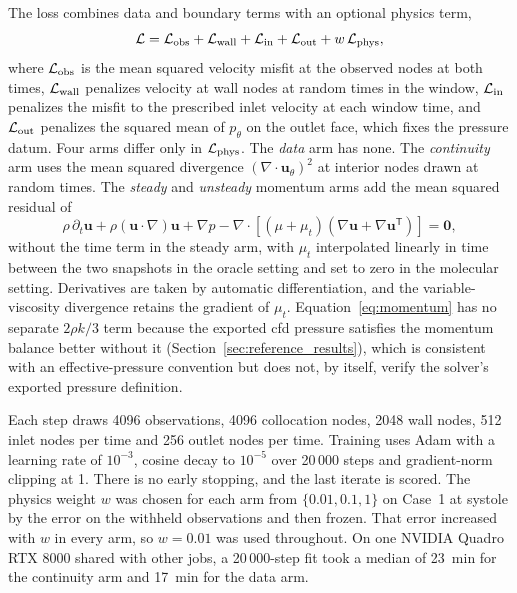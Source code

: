 \documentclass[12pt,a4paper]{article}
\newcommand{\CFD}{\ac{cfd}\xspace}
\theoremstyle{definition}
\numberwithin{equation}{section}
\begin{document}
The loss combines data and boundary terms with an optional physics term,
\begin{equation}
\mathcal L=\mathcal L_{\rm obs}+\mathcal L_{\rm wall}+\mathcal L_{\rm in}+\mathcal L_{\rm out}+w\,\mathcal L_{\rm phys},
\label{eq:loss}
\end{equation}
where $\mathcal L_{\rm obs}$ is the mean squared velocity misfit at the observed nodes at both times, $\mathcal L_{\rm wall}$ penalizes velocity at wall nodes at random times in the window, $\mathcal L_{\rm in}$ penalizes the misfit to the prescribed inlet velocity at each window time, and $\mathcal L_{\rm out}$ penalizes the squared mean of $p_\theta$ on the outlet face, which fixes the pressure datum. Four arms differ only in $\mathcal L_{\rm phys}$. The \emph{data} arm has none. The \emph{continuity} arm uses the mean squared divergence $(\nabla\cdot\mathbf u_\theta)^2$ at interior nodes drawn at random times. The \emph{steady} and \emph{unsteady} momentum arms add the mean squared residual of
\begin{equation}
\rho\,\partial_t\mathbf u+\rho(\mathbf u\cdot\nabla)\mathbf u
+\nabla p-\nabla\cdot\left[(\mu+\mu_t)
(\nabla\mathbf u+\nabla\mathbf u^{\mathsf T})\right]=\mathbf 0,
\label{eq:momentum}
\end{equation}
without the time term in the steady arm, with $\mu_t$ interpolated linearly in time between the two snapshots in the oracle setting and set to zero in the molecular setting. Derivatives are taken by automatic differentiation, and the variable-viscosity divergence retains the gradient of $\mu_t$. Equation~\eqref{eq:momentum} has no separate $2\rho k/3$ term because the exported \CFD pressure satisfies the momentum balance better without it (Section~\ref{sec:reference_results}), which is consistent with an effective-pressure convention but does not, by itself, verify the solver's exported pressure definition.

Each step draws 4096 observations, 4096 collocation nodes, 2048 wall nodes, 512 inlet nodes per time and 256 outlet nodes per time. Training uses Adam with a learning rate of $10^{-3}$, cosine decay to $10^{-5}$ over 20\,000 steps and gradient-norm clipping at 1. There is no early stopping, and the last iterate is scored. The physics weight $w$ was chosen for each arm from $\{0.01,0.1,1\}$ on Case~1 at systole by the error on the withheld observations and then frozen. That error increased with $w$ in every arm, so $w=0.01$ was used throughout. On one NVIDIA Quadro RTX 8000 shared with other jobs, a 20\,000-step fit took a median of 23~min for the continuity arm and 17~min for the data arm.
\end{document}
